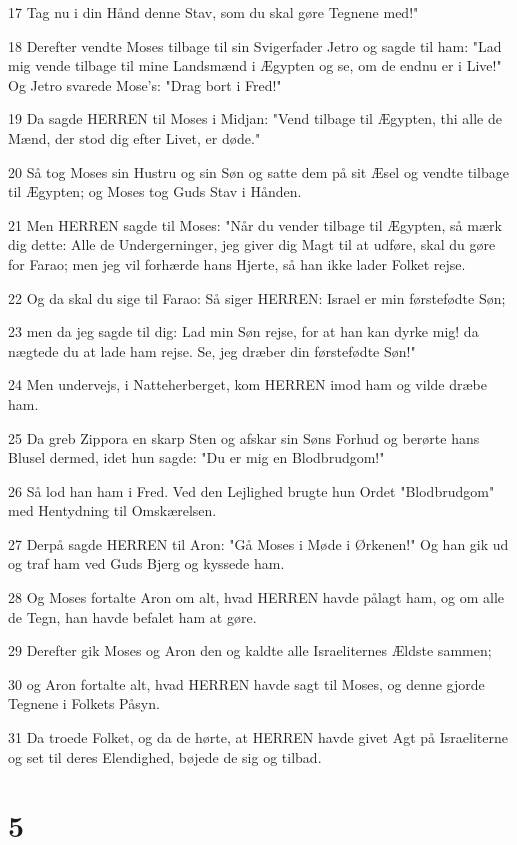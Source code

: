 \par 17 Tag nu i din Hånd denne Stav, som du skal gøre Tegnene med!"
\par 18 Derefter vendte Moses tilbage til sin Svigerfader Jetro og sagde til ham: "Lad mig vende tilbage til mine Landsmænd i Ægypten og se, om de endnu er i Live!" Og Jetro svarede Mose's: "Drag bort i Fred!"
\par 19 Da sagde HERREN til Moses i Midjan: "Vend tilbage til Ægypten, thi alle de Mænd, der stod dig efter Livet, er døde."
\par 20 Så tog Moses sin Hustru og sin Søn og satte dem på sit Æsel og vendte tilbage til Ægypten; og Moses tog Guds Stav i Hånden.
\par 21 Men HERREN sagde til Moses: "Når du vender tilbage til Ægypten, så mærk dig dette: Alle de Undergerninger, jeg giver dig Magt til at udføre, skal du gøre for Farao; men jeg vil forhærde hans Hjerte, så han ikke lader Folket rejse.
\par 22 Og da skal du sige til Farao: Så siger HERREN: Israel er min førstefødte Søn;
\par 23 men da jeg sagde til dig: Lad min Søn rejse, for at han kan dyrke mig! da nægtede du at lade ham rejse. Se, jeg dræber din førstefødte Søn!"
\par 24 Men undervejs, i Natteherberget, kom HERREN imod ham og vilde dræbe ham.
\par 25 Da greb Zippora en skarp Sten og afskar sin Søns Forhud og berørte hans Blusel dermed, idet hun sagde: "Du er mig en Blodbrudgom!"
\par 26 Så lod han ham i Fred. Ved den Lejlighed brugte hun Ordet "Blodbrudgom" med Hentydning til Omskærelsen.
\par 27 Derpå sagde HERREN til Aron: "Gå Moses i Møde i Ørkenen!" Og han gik ud og traf ham ved Guds Bjerg og kyssede ham.
\par 28 Og Moses fortalte Aron om alt, hvad HERREN havde pålagt ham, og om alle de Tegn, han havde befalet ham at gøre.
\par 29 Derefter gik Moses og Aron den og kaldte alle Israeliternes Ældste sammen;
\par 30 og Aron fortalte alt, hvad HERREN havde sagt til Moses, og denne gjorde Tegnene i Folkets Påsyn.
\par 31 Da troede Folket, og da de hørte, at HERREN havde givet Agt på Israeliterne og set til deres Elendighed, bøjede de sig og tilbad.

\chapter{5}

